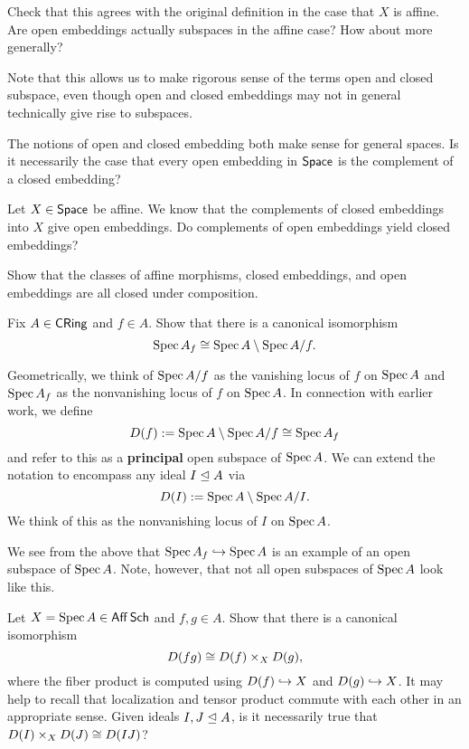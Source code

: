 \documentclass[11pt]{article}
\begin{document}
\begin{exercise}
Check that this agrees with the original definition in the case that $X$ is affine. Are open embeddings actually subspaces in the affine case? How about more generally?
\end{exercise}

Note that this allows us to make rigorous sense of the terms open and closed subspace, even though open and closed embeddings may not in general technically give rise to subspaces. 

\begin{exercise}
The notions of open and closed embedding both make sense for general spaces. Is it necessarily the case that every open embedding in $\operatorname{\mathsf{Space}}$ is the complement of a closed embedding?
\end{exercise}

\begin{exercise}
Let $X\in\operatorname{\mathsf{Space}}$ be affine. We know that the complements of closed embeddings into $X$ give open embeddings. Do complements of open embeddings yield closed embeddings?
\end{exercise}

\begin{exercise}
Show that the classes of affine morphisms, closed embeddings, and open embeddings are all closed under composition.
\end{exercise}

\begin{exercise}
Fix $A\in\operatorname{\mathsf{CRing}}$ and $f\in A$. Show that there is a canonical isomorphism 
$$\operatorname{Spec} A_f\cong\operatorname{Spec} A\setminus\operatorname{Spec} A/f.$$
\end{exercise}

Geometrically, we think of $\operatorname{Spec} A/f$ as the vanishing locus of $f$ on $\operatorname{Spec} A$ and $\operatorname{Spec} A_f$ as the nonvanishing locus of $f$ on $\operatorname{Spec} A$. In connection with earlier work, we define 
$$D(f):=\operatorname{Spec} A\setminus\operatorname{Spec} A/f\cong\operatorname{Spec} A_f$$
and refer to this as a \textbf{principal} open subspace of $\operatorname{Spec} A$. We can extend the notation to encompass any ideal $I\trianglelefteq A$ via
$$D(I):=\operatorname{Spec} A\setminus\operatorname{Spec} A/I.$$
We think of this as the nonvanishing locus of $I$ on $\operatorname{Spec} A$. 

\begin{remark}
We see from the above that $\operatorname{Spec} A_f\hookrightarrow\operatorname{Spec} A$ is an example of an open subspace of $\operatorname{Spec} A$. Note, however, that not all open subspaces of $\operatorname{Spec} A$ look like this.
\end{remark}

\begin{exercise}
Let $X=\operatorname{Spec} A\in\operatorname{\mathsf{Aff}}\operatorname{\mathsf{Sch}}$ and $f,g\in A$. Show that there is a canonical isomorphism
$$D(fg)\cong D(f)\times_XD(g),$$
where the fiber product is computed using $D(f)\hookrightarrow X$ and $D(g)\hookrightarrow X$. It may help to recall that localization and tensor product commute with each other in an appropriate sense. Given ideals $I,J\trianglelefteq A$, is it necessarily true that $D(I)\times_XD(J)\cong D(IJ)$?
\end{exercise}
\end{document}
